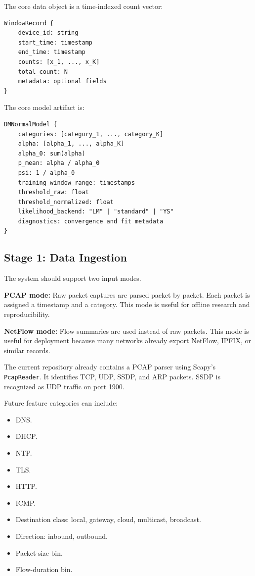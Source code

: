 \documentclass[11pt,a4paper]{article}
\begin{document}
The core data object is a time-indexed count vector:

\begin{lstlisting}
WindowRecord {
    device_id: string
    start_time: timestamp
    end_time: timestamp
    counts: [x_1, ..., x_K]
    total_count: N
    metadata: optional fields
}
\end{lstlisting}

The core model artifact is:

\begin{lstlisting}
DMNormalModel {
    categories: [category_1, ..., category_K]
    alpha: [alpha_1, ..., alpha_K]
    alpha_0: sum(alpha)
    p_mean: alpha / alpha_0
    psi: 1 / alpha_0
    training_window_range: timestamps
    threshold_raw: float
    threshold_normalized: float
    likelihood_backend: "LM" | "standard" | "YS"
    diagnostics: convergence and fit metadata
}
\end{lstlisting}

\subsection{Stage 1: Data Ingestion}

The system should support two input modes.

\textbf{PCAP mode:} Raw packet captures are parsed packet by packet. Each packet is assigned a timestamp and a category. This mode is useful for offline research and reproducibility.

\textbf{NetFlow mode:} Flow summaries are used instead of raw packets. This mode is useful for deployment because many networks already export NetFlow, IPFIX, or similar records.

The current repository already contains a PCAP parser using Scapy's \texttt{PcapReader}. It identifies TCP, UDP, SSDP, and ARP packets. SSDP is recognized as UDP traffic on port 1900.

Future feature categories can include:

\begin{itemize}
  \item DNS.
  \item DHCP.
  \item NTP.
  \item TLS.
  \item HTTP.
  \item ICMP.
  \item Destination class: local, gateway, cloud, multicast, broadcast.
  \item Direction: inbound, outbound.
  \item Packet-size bin.
  \item Flow-duration bin.
\end{itemize}
\end{document}
